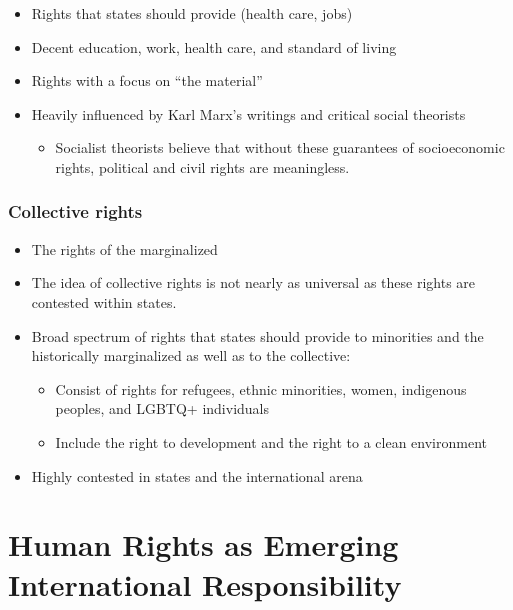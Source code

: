 \documentclass[
]{book}
\providecommand{\tightlist}{%
  \setlength{\itemsep}{0pt}\setlength{\parskip}{0pt}}
\begin{document}
\begin{itemize}
\item
  Rights that states should provide (health care, jobs)
\item
  Decent education, work, health care, and standard of living
\item
  Rights with a focus on ``the material''
\item
  Heavily influenced by Karl Marx's writings and critical social theorists

  \begin{itemize}
  \tightlist
  \item
    Socialist theorists believe that without these guarantees of socioeconomic rights, political and civil rights are meaningless.
  \end{itemize}
\end{itemize}

\hypertarget{collective-rights}{%
\subsubsection{Collective rights}\label{collective-rights}}

\begin{itemize}
\item
  The rights of the marginalized
\item
  The idea of collective rights is not nearly as universal as these rights are contested within states.
\item
  Broad spectrum of rights that states should provide to minorities and the historically marginalized as well as to the collective:

  \begin{itemize}
  \item
    Consist of rights for refugees, ethnic minorities, women, indigenous peoples, and LGBTQ+ individuals
  \item
    Include the right to development and the right to a clean environment
  \end{itemize}
\item
  Highly contested in states and the international arena
\end{itemize}

\hypertarget{human-rights-as-emerging-international-responsibility}{%
\section{Human Rights as Emerging International Responsibility}\label{human-rights-as-emerging-international-responsibility}}
\end{document}
